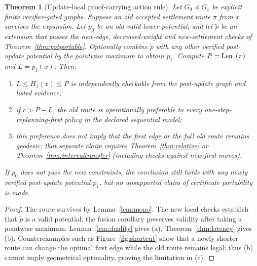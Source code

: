 \documentclass[11pt]{article}
\newtheorem{theorem}{Theorem}[section]
\theoremstyle{definition}\newtheorem{definition}[theorem]{Definition}\newtheorem{assumption}[theorem]{Assumption}
\theoremstyle{remark}\newtheorem{remark}[theorem]{Remark}
\begin{document}
\begin{theorem}[Update-local proof-carrying action rule]\label{thm:main}
Let $G_0\preceq G_1$ be explicit finite verifier-gated graphs. Suppose an old accepted settlement route $\pi$ from $x$ survives the expansion. Let $p_0$ be an old valid lower potential, and let $\widetilde p$ be an extension that passes the new-edge, decreased-weight and new-settlement checks of Theorem~\ref{thm:potportable}. Optionally combine $\widetilde p$ with any other verified post-update potential by the pointwise maximum to obtain $p_1$. Compute $P=\operatorname{Len}_1(\pi)$ and $L=p_1(x)$. Then:
\begin{enumerate}[label=(\alph*)]
\item $L\leq H_1(x)\leq P$ is independently checkable from the post-update graph and listed evidence;
\item if $c>P-L$, the old route is operationally preferable to \emph{every} one-step-replanning-first policy in the declared sequential model;
\item this preference does \emph{not} imply that the first edge or the full old route remains geodesic; that separate claim requires Theorem~\ref{thm:relative} or Theorem~\ref{thm:intervaltransfer} (including checks against new first moves).
\end{enumerate}
If $p_0$ does not pass the new constraints, the conclusion still holds with \emph{any} newly verified post-update potential $p_1$, but no unsupported claim of certificate portability is made.
\end{theorem}
\begin{proof}
The route survives by Lemma~\ref{lem:mono}. The new local checks establish that $\widetilde p$ is a valid potential; the fusion corollary preserves validity after taking a pointwise maximum. Lemma~\ref{lem:duality} gives (a). Theorem~\ref{thm:latency} gives (b). Counterexamples such as Figure~\ref{fig:shortcut} show that a newly shorter route can change the optimal first edge while the old route remains legal; thus (b) cannot imply geometrical optimality, proving the limitation in (c).
\end{proof}
\par
\end{document}
